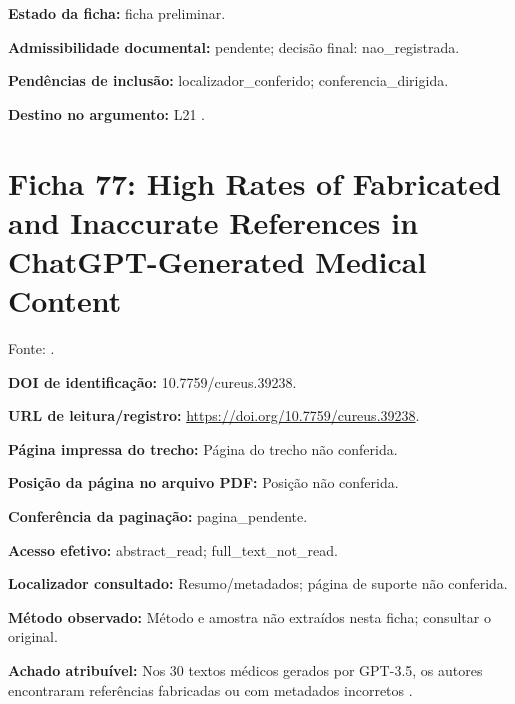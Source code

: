 \noindent\textbf{Estado da ficha:} ficha preliminar.\par\medskip

\noindent\textbf{Admissibilidade documental:} pendente; decisão final: nao\_registrada.\par\medskip

\noindent\textbf{Pendências de inclusão:} localizador\_conferido; conferencia\_dirigida.\par\medskip

\noindent\textbf{Destino no argumento:} L21 .

\clearpage\section*{Ficha 77: High Rates of Fabricated and Inaccurate References in ChatGPT-Generated Medical Content}

Fonte: \citet{SU07}.

\noindent\textbf{DOI de identificação:} 10.7759/cureus.39238.\par\medskip

\noindent\textbf{URL de leitura/registro:} \url{https://doi.org/10.7759/cureus.39238}.\par\medskip

\noindent\textbf{Página impressa do trecho:} Página do trecho não conferida.\par\medskip

\noindent\textbf{Posição da página no arquivo PDF:} Posição não conferida.\par\medskip

\noindent\textbf{Conferência da paginação:} pagina\_pendente.\par\medskip

\noindent\textbf{Acesso efetivo:} abstract\_read; full\_text\_not\_read.\par\medskip

\noindent\textbf{Localizador consultado:} Resumo/metadados; página de suporte não conferida.\par\medskip

\noindent\textbf{Método observado:} Método e amostra não extraídos nesta ficha; consultar o original.\par\medskip

\noindent\textbf{Achado atribuível:} Nos 30 textos médicos gerados por GPT-3.5, os autores encontraram referências fabricadas ou com metadados incorretos \citep{SU07}.\par\medskip

